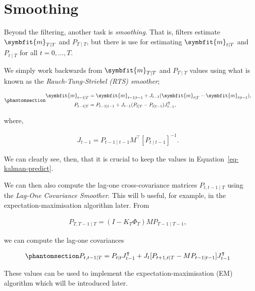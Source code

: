 \documentclass[
]{report}
\newcommand{\bv}[1]{\symbfit{#1}}
\theoremstyle{plain}
\theoremstyle{plain}
\theoremstyle{plain}
\theoremstyle{remark}
\begin{document}
\section{Smoothing}\label{smoothing}

Beyond the filtering, another task is \emph{smoothing}. That is, filters
estimate \(\bv m_{T\mid T}\) and \(P_{T\mid T}\), but there is use for
estimating \(\bv m_{t\mid T}\) and \(P_{t\mid T}\) for all
\(t=0,\dots, T\).

We simply work backwards from \(\bv m_{T\mid T}\) and \(P_{T\mid T}\)
values using what is known as the \emph{Rauch-Tung-Striebel (RTS)
smoother};

\begin{equation}\phantomsection\label{eq-kalmansmooth}{\begin{split}
\bv m_{t-1\mid T} &= \bv m_{t-1\mid t-1} + J_{t-1}(\bv m_{t\mid T} - \bv m_{t\mid t-1}),\\
P_{t-1\mid T} &= P_{t-1\mid t-1} + J_{t-1}(P_{t\mid T} - P_{t\mid t-1})J_{t-1}^\intercal,
\end{split}
}\end{equation}

where,

\[\begin{split}
J_{t-1} = P_{t-1\mid t-1}M^\intercal[P_{t\mid t-1}]^{-1}.
\end{split}
\]

We can clearly see, then, that it is crucial to keep the values in
Equation~\ref{eq-kalman-predict}.

We can then also compute the lag-one cross-covariance matrices
\(P_{t,t-1\mid T}\) using the \emph{Lag-One Covariance Smoother}. This
will b useful, for example, in the expectation-maximisation algorithm
later. From

\[\begin{split}
P_{T,T-1\mid T} = (I - K_T\Phi_{T}) MP_{T-1\mid T-1},
\end{split}
\]

we can compute the lag-one covariances

\begin{equation}\phantomsection\label{eq-lag1smooth}{\begin{split}
P_{t, t-1\mid T} = P_{t\mid t}J_{t-1}^\intercal + J_{t}[P_{t+1,t\mid T} - MP_{t-1\mid t-1}]J_{t-1}^\intercal
\end{split}
}\end{equation}

These values can be used to implement the expectation-maximisation (EM)
algorithm which will be introduced later.
\end{document}
